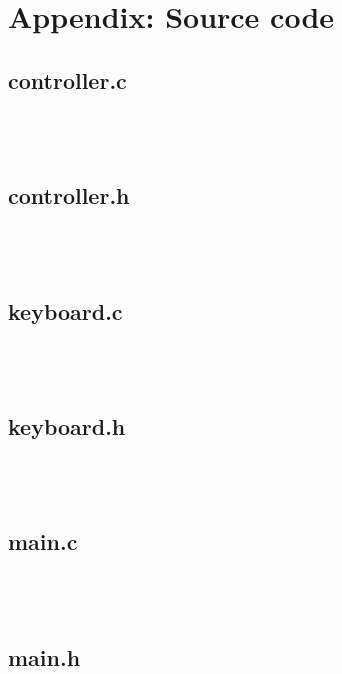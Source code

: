 \documentclass{article}
\begin{document}
\section*{Appendix: Source code}

\subsection*{controller.c}

\begin{verbatim}



\end{verbatim}

\subsection*{controller.h}

\begin{verbatim}



\end{verbatim}

\subsection*{keyboard.c}

\begin{verbatim}



\end{verbatim}

\subsection*{keyboard.h}

\begin{verbatim}



\end{verbatim}

\subsection*{main.c}

\begin{verbatim}



\end{verbatim}

\subsection*{main.h}
\end{document}
